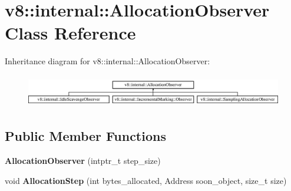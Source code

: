 \hypertarget{classv8_1_1internal_1_1_allocation_observer}{}\section{v8\+:\+:internal\+:\+:Allocation\+Observer Class Reference}
\label{classv8_1_1internal_1_1_allocation_observer}
Inheritance diagram for v8\+:\+:internal\+:\+:Allocation\+Observer\+:\begin{figure}[H]
\begin{center}
\leavevmode
\includegraphics[height=1.441442cm]{classv8_1_1internal_1_1_allocation_observer}
\end{center}
\end{figure}
\subsection*{Public Member Functions}
\begin{DoxyCompactItemize}
\item 
{\bfseries Allocation\+Observer} (intptr\+\_\+t step\+\_\+size)\hypertarget{classv8_1_1internal_1_1_allocation_observer_afd17faabb89efdf1211915e9e684a31f}{}\label{classv8_1_1internal_1_1_allocation_observer_afd17faabb89efdf1211915e9e684a31f}

\item 
void {\bfseries Allocation\+Step} (int bytes\+\_\+allocated, Address soon\+\_\+object, size\+\_\+t size)\hypertarget{classv8_1_1internal_1_1_allocation_observer_a83b330ab2d41bd63c8463c98e3b44139}{}\label{classv8_1_1internal_1_1_allocation_observer_a83b330ab2d41bd63c8463c98e3b44139}

\end{DoxyCompactItemize}
